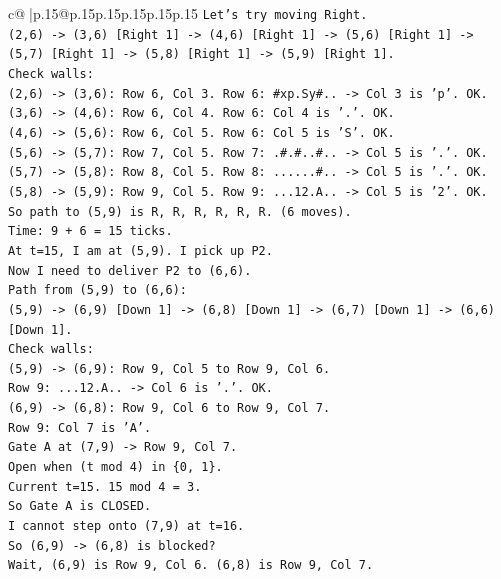 \documentclass{article}
\begin{document}
{\begin{supertabular}{c@{$\;$}|p{.15\linewidth}@{}p{.15\linewidth}p{.15\linewidth}p{.15\linewidth}p{.15\linewidth}p{.15\linewidth}}
{{{\texttt{Let's try moving Right.} \\
\texttt{(2,6) {-}> (3,6) {[}Right 1{]} {-}> (4,6) {[}Right 1{]} {-}> (5,6) {[}Right 1{]} {-}> (5,7) {[}Right 1{]} {-}> (5,8) {[}Right 1{]} {-}> (5,9) {[}Right 1{]}.} \\
\texttt{Check walls:} \\
\texttt{(2,6) {-}> (3,6): Row 6, Col 3. Row 6: \#xp.Sy\#.. {-}> Col 3 is 'p'. OK.} \\
\texttt{(3,6) {-}> (4,6): Row 6, Col 4. Row 6: Col 4 is '.'. OK.} \\
\texttt{(4,6) {-}> (5,6): Row 6, Col 5. Row 6: Col 5 is 'S'. OK.} \\
\texttt{(5,6) {-}> (5,7): Row 7, Col 5. Row 7: .\#.\#..\#.. {-}> Col 5 is '.'. OK.} \\
\texttt{(5,7) {-}> (5,8): Row 8, Col 5. Row 8: ......\#.. {-}> Col 5 is '.'. OK.} \\
\texttt{(5,8) {-}> (5,9): Row 9, Col 5. Row 9: ...12.A.. {-}> Col 5 is '2'. OK.} \\
\texttt{So path to (5,9) is R, R, R, R, R, R. (6 moves).} \\
\texttt{Time: 9 + 6 = 15 ticks.} \\
\texttt{At t=15, I am at (5,9). I pick up P2.} \\
\texttt{Now I need to deliver P2 to (6,6).} \\
\texttt{Path from (5,9) to (6,6):} \\
\texttt{(5,9) {-}> (6,9) {[}Down 1{]} {-}> (6,8) {[}Down 1{]} {-}> (6,7) {[}Down 1{]} {-}> (6,6) {[}Down 1{]}.} \\
\texttt{Check walls:} \\
\texttt{(5,9) {-}> (6,9): Row 9, Col 5 to Row 9, Col 6.} \\
\texttt{Row 9: ...12.A.. {-}> Col 6 is '.'. OK.} \\
\texttt{(6,9) {-}> (6,8): Row 9, Col 6 to Row 9, Col 7.} \\
\texttt{Row 9: Col 7 is 'A'.} \\
\texttt{Gate A at (7,9) {-}> Row 9, Col 7.} \\
\texttt{Open when (t mod 4) in \{0, 1\}.} \\
\texttt{Current t=15. 15 mod 4 = 3.} \\
\texttt{So Gate A is CLOSED.} \\
\texttt{I cannot step onto (7,9) at t=16.} \\
\texttt{So (6,9) {-}> (6,8) is blocked?} \\
\texttt{Wait, (6,9) is Row 9, Col 6. (6,8) is Row 9, Col 7.} \\
}}}
\end{supertabular}}
\end{document}
